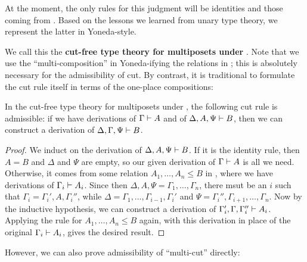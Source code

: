 At the moment, the only rules for this judgment will be identities and those coming from \cG.
Based on the lessons we learned from unary type theory, we represent the latter in Yoneda-style.
We call this the \textbf{cut-free type theory for multiposets under \cG}.
Note that we use the ``multi-composition'' in Yoneda-ifying the relations in \cG; this is absolutely necessary for the admissibility of cut.
By contrast, it is traditional to formulate the cut rule itself in terms of the one-place compositions:

\begin{thm}\label{thm:multiposet-cutadm}
  In the cut-free type theory for multiposets under \cG, the following cut rule is admissible: if we have derivations of $\Gamma\vdash A$ and of $\Delta,A,\Psi\vdash B$, then we can construct a derivation of $\Delta,\Gamma,\Psi\vdash B$.
\end{thm}
\begin{proof}
  We induct on the derivation of $\Delta,A,\Psi\vdash B$.
  If it is the identity rule, then $A=B$ and $\Delta$ and $\Psi$ are empty, so our given derivation of $\Gamma\vdash A$ is all we need.
  Otherwise, it comes from some relation $A_1,\dots,A_n \le B$ in \cG, where we have derivations of $\Gamma_i \vdash A_i$.
  Since then $\Delta,A,\Psi = \Gamma_1,\dots,\Gamma_n$, there msut be an $i$ such that $\Gamma_i = \Gamma_i',A,\Gamma_i''$, while $\Delta = \Gamma_1,\dots,\Gamma_{i-1},\Gamma_i'$ and $\Psi = \Gamma_i'',\Gamma_{i+1},\dots,\Gamma_n$.
  Now by the inductive hypothesis, we can construct a derivation of $\Gamma_i',\Gamma,\Gamma_i''\vdash A_i$.
  Applying the rule for $A_1,\dots,A_n \le B$ again, with this derivation in place of the original $\Gamma_i \vdash A_i$, gives the desired result.
\end{proof}

However, we can also prove admissibility of ``multi-cut'' directly:

